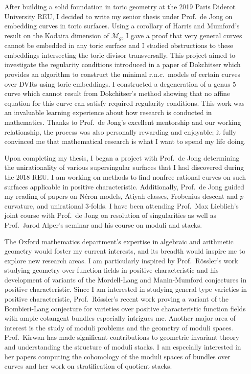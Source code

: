 \documentclass[11pt]{article}
\begin{document}
\par
After building a solid foundation in toric geometry at the 2019 Paris Diderot University REU, I decided to write my senior thesis under Prof.\ de Jong on embedding curves in toric surfaces. Using a corollary of Harris and Mumford's result on the Kodaira dimension of $\overline{\mathcal{M}}_g$, I gave a proof that very general curves cannot be embedded in any toric surface and I studied obstructions to these embeddings intersecting the toric divisor transversally. This project aimed to investigate the regularity conditions introduced in a paper of Dokchitser  which provides an algorithm to construct the minimal r.n.c.\ models of certain curves over DVRs using toric embeddings. I constructed a degeneration of a genus 5 curve which cannot result from Dokchitser's method showing that no affine equation for this curve can satisfy required regularity conditions. This work was an invaluable learning experience about how research is conducted in mathematics. Thanks to Prof.\ de Jong’s excellent mentorship and our working relationship, the process was also personally rewarding and enjoyable; it fully convinced me that mathematical research is what I want to spend my life doing. 
\par 
Upon completing my thesis, I began a project with Prof.\ de Jong determining the unirationality of various supersingular surfaces that I had discovered during the 2018 REU.  I am working on methods to find nonfree rational curves on such surfaces applicable in positive characteristic. Additionally, Prof.\ de Jong guided my reading of papers on N\'{e}ron models, Atiyah classes, Frobenius descent and $p$-curvature, and unirational $3$-folds. I have been attending Prof.\ Max Lieblich's joint course with Prof.\ de Jong on resolution of singularities as well as Prof.\ Jarod Alper’s seminar and his course on moduli and stacks.
\par
The Oxford mathematics department's expertise in algebraic and arithmetic geometry would foster my current interests, and its breadth would inspire me to explore new research areas. I am particularly inspired by Prof.\ R\"{o}ssler’s work studying geometry over function fields in positive characteristic and his development of variants of the Mordell-Lang and Manin-Mumford conjectures in positive characteristic. Since I am interested in studying general type varieties in positive characteristic, Prof.\ R\"{o}ssler’s recent work proving a variant of the Bombieri-Lang conjecture for varieties over positive characteristic function fields with ample cotangent bundles especially intrigues me. Another major area of interest is the study of moduli problems and the geometry of moduli spaces. Prof.\ Kirwan has made significant contributions to geometric invariant theory and understanding the structure of moduli stacks. I am especially interested in her papers computing the cohomology of the moduli spaces of bundles over curves and her work on stratification of quotient stacks. 
\end{document}
